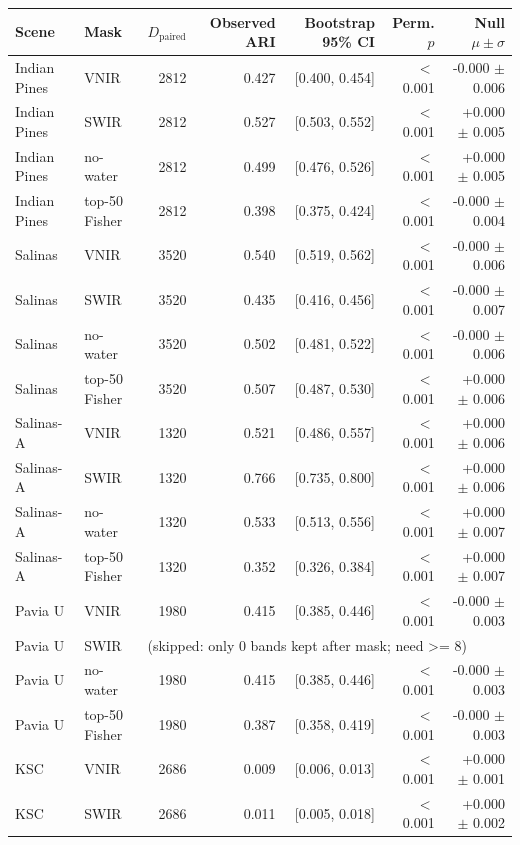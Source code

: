 \begin{tabular}{llrrrrr}
\toprule
Scene & Mask & $D_{\text{paired}}$ & Observed ARI & Bootstrap 95\% CI & Perm. $p$ & Null $\mu \pm \sigma$ \\
\midrule
Indian Pines & VNIR & 2812 & 0.427 & [0.400, 0.454] & $<$ 0.001 & -0.000 $\pm$ 0.006 \\
Indian Pines & SWIR & 2812 & 0.527 & [0.503, 0.552] & $<$ 0.001 & +0.000 $\pm$ 0.005 \\
Indian Pines & no-water & 2812 & 0.499 & [0.476, 0.526] & $<$ 0.001 & +0.000 $\pm$ 0.005 \\
Indian Pines & top-50 Fisher & 2812 & 0.398 & [0.375, 0.424] & $<$ 0.001 & -0.000 $\pm$ 0.004 \\
Salinas & VNIR & 3520 & 0.540 & [0.519, 0.562] & $<$ 0.001 & -0.000 $\pm$ 0.006 \\
Salinas & SWIR & 3520 & 0.435 & [0.416, 0.456] & $<$ 0.001 & -0.000 $\pm$ 0.007 \\
Salinas & no-water & 3520 & 0.502 & [0.481, 0.522] & $<$ 0.001 & -0.000 $\pm$ 0.006 \\
Salinas & top-50 Fisher & 3520 & 0.507 & [0.487, 0.530] & $<$ 0.001 & +0.000 $\pm$ 0.006 \\
Salinas-A & VNIR & 1320 & 0.521 & [0.486, 0.557] & $<$ 0.001 & +0.000 $\pm$ 0.006 \\
Salinas-A & SWIR & 1320 & 0.766 & [0.735, 0.800] & $<$ 0.001 & +0.000 $\pm$ 0.006 \\
Salinas-A & no-water & 1320 & 0.533 & [0.513, 0.556] & $<$ 0.001 & +0.000 $\pm$ 0.007 \\
Salinas-A & top-50 Fisher & 1320 & 0.352 & [0.326, 0.384] & $<$ 0.001 & +0.000 $\pm$ 0.007 \\
Pavia U & VNIR & 1980 & 0.415 & [0.385, 0.446] & $<$ 0.001 & -0.000 $\pm$ 0.003 \\
Pavia U & SWIR & \multicolumn{5}{l}{(skipped: only 0 bands kept after mask; need >= 8)} \\
Pavia U & no-water & 1980 & 0.415 & [0.385, 0.446] & $<$ 0.001 & -0.000 $\pm$ 0.003 \\
Pavia U & top-50 Fisher & 1980 & 0.387 & [0.358, 0.419] & $<$ 0.001 & -0.000 $\pm$ 0.003 \\
KSC & VNIR & 2686 & 0.009 & [0.006, 0.013] & $<$ 0.001 & +0.000 $\pm$ 0.001 \\
KSC & SWIR & 2686 & 0.011 & [0.005, 0.018] & $<$ 0.001 & +0.000 $\pm$ 0.002 \\

\end{tabular}
